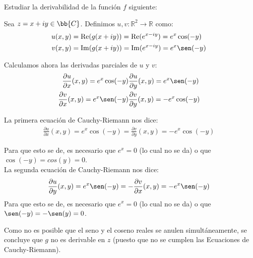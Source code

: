 \documentclass[12pt]{article}
\renewcommand{\Re}{\operatorname{Re}} %
\renewcommand{\Im}{\operatorname{Im}}
\begin{document}
    \begin{ejercicio}[2 puntos]
        Estudiar la derivabilidad de la función $f$ siguiente:


        Sea $z=x+iy\in \bb{C}$. Definimos $u,v:\mathbb{R}^2\to\mathbb{R}$ como:
        \begin{align*}
            u(x,y) &= \Re(g(x+iy)) = \Re(e^{x-iy}) = e^x\cos (-y)\\
            v(x,y) &= \Im(g(x+iy)) = \Im(e^{x-iy}) = e^x\sen (-y)
        \end{align*}

        Calculamos ahora las derivadas parciales de $u$ y $v$:
        \begin{align*}
            \frac{\partial u}{\partial x}(x,y) = e^x\cos (-y)&
            \frac{\partial u}{\partial y}(x,y) = e^x\sen (-y)\\
            \frac{\partial v}{\partial x}(x,y) = e^x\sen (-y)&
            \frac{\partial v}{\partial y}(x,y) = -e^x\cos (-y)
        \end{align*}

        La primera ecuación de Cauchy-Riemann nos dice:
        \begin{align*}
            \frac{\partial u}{\partial x}(x,y) = e^x\cos(-y)
            = \frac{\partial v}{\partial y}(x,y) = -e^x\cos(-y)
        \end{align*}

        Para que esto se de, es necesario que $e^x=0$ (lo cual no se da) o que $\cos(-y)=cos(y)=0$.\\

        La segunda ecuación de Cauchy-Riemann nos dice:
        \begin{align*}
            \frac{\partial u}{\partial y}(x,y) = e^x\sen(-y)
            = -\frac{\partial v}{\partial x}(x,y) = -e^x\sen(-y)
        \end{align*}
        Para que esto se de, es necesario que $e^x=0$ (lo cual no se da) o que $\sen(-y)=-\sen(y)=0$.

        Como no es posible que el seno y el coseno reales se anulen simultáneamente, se concluye que $g$ no es derivable en $z$ (puesto que no se cumplen las Ecuaciones de Cauchy-Riemann).
    \end{ejercicio}
\end{document}
